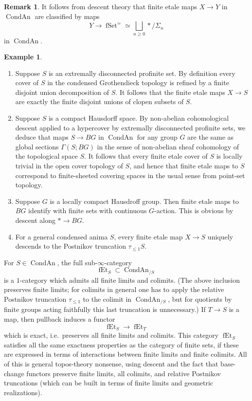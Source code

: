 \documentclass[12pt]{article}
\theoremstyle{definition}
\newtheorem{example}[theorem]{Example}
\newtheorem{remark}[theorem]{Remark}
\newcommand{\on}{\operatorname}
\begin{document}
\begin{remark}
It follows from descent theory that finite etale maps $X\to Y$ in $\on{CondAn}$ are classified by maps
$$Y \to \on{fSet}^\simeq \simeq \bigsqcup_{n\geq 0} \ast/\Sigma_n$$
in $\on{CondAn}$.
\end{remark}

\begin{example}
\begin{enumerate}
\item Suppose $S$ is an extremally disconnected profinite set.  By definition every cover of $S$ in the condensed Grothendieck topology is refined by a finite disjoint union decomposition of $S$.  It follows that the finite etale maps $X\to S$ are exactly the finite disjoint unions of clopen subsets of $S$.
\item Suppose $S$ is a compact Hausdorff space.  By non-abelian cohomological descent applied to a hypercover by extremally disconnected profinite sets, we deduce that maps $S \to BG$ in $\on{CondAn}$ for any group $G$ 
are the same as global sections $\Gamma(S;BG)$ in the sense of non-abelian sheaf cohomology of the topological space $S$.  It follows that every finite etale cover of $S$ is locally trivial in the open cover topology of $S$, and hence that finite etale maps to $S$ correspond to finite-sheeted covering spaces in the usual sense from point-set topology.
\item Suppose $G$ is a locally compact Hausdroff group.  Then finite etale maps to $BG$ identify with finite sets with continuous $G$-action.  This is obvious by descent along $\ast\to BG$.
\item For a general condensed anima $S$, every finite etale map $X\to S$ uniquely descends to the Postnikov truncation $\tau_{\leq 1}S$.
\end{enumerate}
\end{example}

For $S\in\on{CondAn}$, the full sub-$\infty$-category
$$\on{fEt}_S\subset \on{CondAn}_{/S}$$
is a $1$-category which admits all finite limits and colimits.  (The above inclusion preserves finite limits; for colimits in general one has to apply the relative Postnikov truncation $\tau_{\leq 1}$ to the colimit in $\on{CondAn}_{/S}$, but for quotients by finite groups acting faithfully this last truncation is unnecessary.)  If $T\to S$ is a map, then pullback induces a functor
$$\on{fEt}_S\to \on{fEt}_T$$
which is exact, i.e.\ preserves all finite limits and colimits.   This category $\on{fEt}_{S}$ satisfies all the same exactness properties as the category of finite sets, if these are expressed in terms of interactions between finite limits and finite colimits. All of this is general topos-theory nonsense, using descent and the fact that base-change functors preserve finite limits, all colimits, and relative Postnikov truncations (which can be built in terms of finite limits and geometric realizations).
\end{document}

